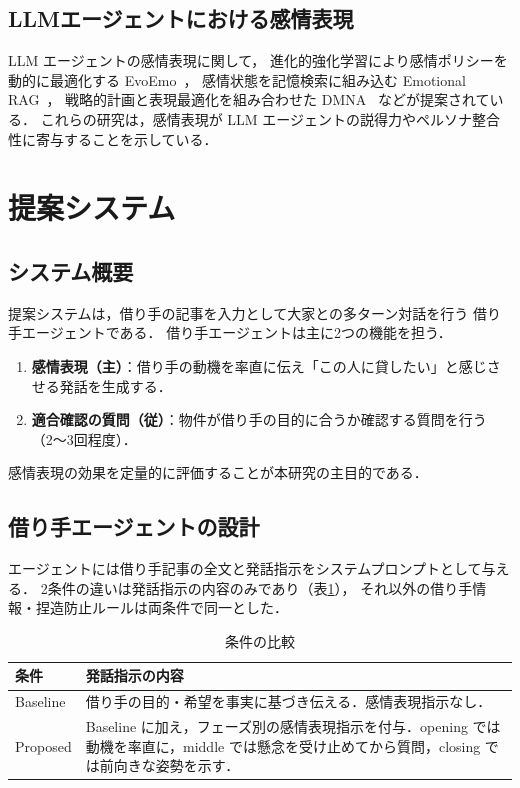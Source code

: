 \documentclass[dvipdfmx]{FITpaper}
\begin{document}
\subsection{LLMエージェントにおける感情表現}

LLM エージェントの感情表現に関して，
進化的強化学習により感情ポリシーを動的に最適化する EvoEmo~\cite{evoemo2025}，
感情状態を記憶検索に組み込む Emotional RAG~\cite{emotionalrag2024}，
戦略的計画と表現最適化を組み合わせた DMNA~\cite{dmna2025} などが提案されている．
これらの研究は，感情表現が LLM エージェントの説得力やペルソナ整合性に寄与することを示している．


\section{提案システム}

\subsection{システム概要}

提案システムは，借り手の記事を入力として大家との多ターン対話を行う
借り手エージェントである．
借り手エージェントは主に2つの機能を担う．

\begin{enumerate}
  \item \textbf{感情表現（主）}：借り手の動機を率直に伝え「この人に貸したい」と感じさせる発話を生成する．
  \item \textbf{適合確認の質問（従）}：物件が借り手の目的に合うか確認する質問を行う（2〜3回程度）．
\end{enumerate}

感情表現の効果を定量的に評価することが本研究の主目的である．

\subsection{借り手エージェントの設計}

エージェントには借り手記事の全文と発話指示をシステムプロンプトとして与える．
2条件の違いは発話指示の内容のみであり（表\ref{tab:condition}），
それ以外の借り手情報・捏造防止ルールは両条件で同一とした．

\begin{table}[t]
  \centering
  \caption{条件の比較}
  \label{tab:condition}

  \begin{tabular}{lp{4.5cm}}
    \toprule
    条件 & 発話指示の内容 \\
    \midrule
    Baseline & 借り手の目的・希望を事実に基づき伝える．感情表現指示なし． \\
    Proposed & Baseline に加え，フェーズ別の感情表現指示を付与．opening では動機を率直に，middle では懸念を受け止めてから質問，closing では前向きな姿勢を示す． \\
    \bottomrule
  \end{tabular}
\end{table}
\end{document}

